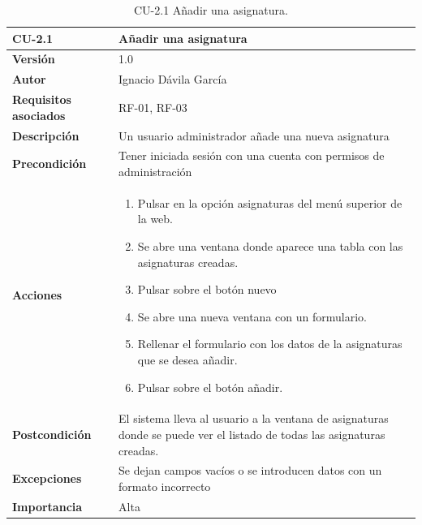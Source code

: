 \begin{table}[p]
	\centering
	\begin{tabularx}{\linewidth}{ p{} p{} }
		\toprule
		\textbf{CU-2.1}    & \textbf{Añadir una asignatura}\\
		\toprule
		\textbf{Versión}              & 1.0    \\
		\textbf{Autor}                & Ignacio Dávila García \\
		\textbf{Requisitos asociados} & RF-01, RF-03 \\
		\textbf{Descripción}          & Un usuario administrador añade una nueva asignatura \\
		\textbf{Precondición}         & Tener iniciada sesión con una cuenta con permisos de administración \\
		\textbf{Acciones}             &
		\begin{enumerate}
			\def\labelenumi{\arabic{enumi}.}
			\tightlist
			\item Pulsar en la opción asignaturas del menú superior de la web.
			\item Se abre una ventana donde aparece una tabla con las asignaturas creadas.
			\item Pulsar sobre el botón nuevo
			\item Se abre una nueva ventana con un formulario.
			\item Rellenar el formulario con los datos de la asignaturas que se desea añadir.
			\item Pulsar sobre el botón añadir.
		\end{enumerate}\\
		\textbf{Postcondición}        & El sistema lleva al usuario a la ventana de asignaturas donde se puede ver el listado de todas las asignaturas creadas. \\
		\textbf{Excepciones}          & Se dejan campos vacíos o se introducen datos con un formato incorrecto \\
		\textbf{Importancia}          & Alta \\
		\bottomrule
	\end{tabularx}
	\caption{CU-2.1 Añadir una asignatura.}
\end{table}

